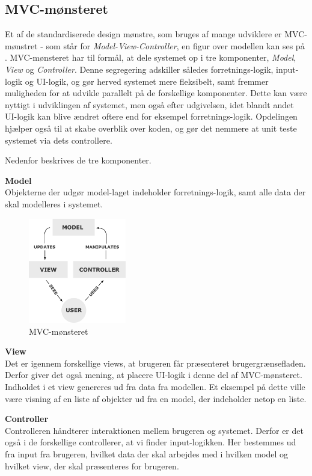 \subsection{MVC-mønsteret}\label{MVC}

Et af de standardiserede design mønstre, som bruges af mange udviklere er MVC-mønstret - som står for \textit{Model-View-Controller}, en figur over modellen kan ses på .
MVC-mønsteret har til formål, at dele systemet op i tre komponenter, \textit{Model}, \textit{View} og \textit{Controller}.
Denne segregering adskiller således forretnings-logik, input-logik og UI-logik, og gør herved systemet mere fleksibelt, samt fremmer muligheden for at udvikle parallelt på de forskellige komponenter.
Dette kan være nyttigt i udviklingen af systemet, men også efter udgivelsen, idet blandt andet UI-logik kan blive ændret oftere end for eksempel forretnings-logik.
Opdelingen hjælper også til at skabe overblik over koden, og gør det nemmere at unit teste systemet via dets controllere. \citep{MVC_Overview}

Nedenfor beskrives de tre komponenter.

\textbf{Model}\\
Objekterne der udgør model-laget indeholder forretnings-logik, samt alle data der skal modelleres i systemet.

\begin{figure}
	\vspace{0pt}
	\begin{center}
		\includegraphics[width=0.38\textwidth]{images/Images/mvc.png}
	\end{center}
	\vspace{-20pt}
	\label{MVC-Figure}
	\caption{MVC-mønsteret \citep{mvcpic}}
	\vspace{-30pt}
\end{figure}

\textbf{View}\\
Det er igennem forskellige views, at brugeren får præsenteret brugergrænsefladen. 
Derfor giver det også mening, at placere UI-logik i denne del af MVC-mønsteret.
Indholdet i et view genereres ud fra data fra modellen.
Et eksempel på dette ville være visning af en liste af objekter ud fra en model, der indeholder netop en liste.

\textbf{Controller}\\
Controlleren håndterer interaktionen mellem brugeren og systemet.
Derfor er det også i de forskellige controllerer, at vi finder input-logikken. 
Her bestemmes ud fra input fra brugeren, hvilket data der skal arbejdes med i hvilken model og hvilket view, der skal præsenteres for brugeren.

